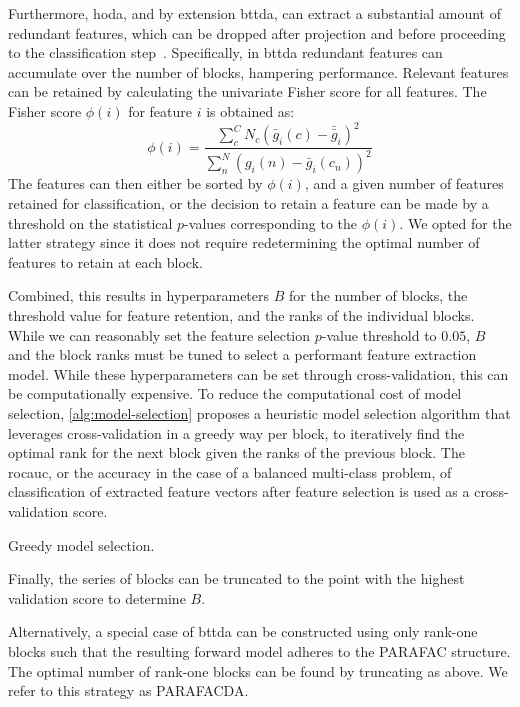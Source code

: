 Furthermore, \ac{hoda}, and by extension \ac{bttda}, can extract a substantial amount
of redundant features, which can be dropped after projection and before proceeding to the classification
step~\cite{Phan2010}.
Specifically, in \ac{bttda} redundant features can accumulate over the number of
blocks, hampering performance.
Relevant features can be retained by calculating the
univariate Fisher score for all features.
The Fisher score $\phi(i)$ for feature $i$ is obtained as:
\begin{equation}
	\phi(i) = \frac
	{\sum_c^C N_c \left(\bar{g}_i(c)-\bar{\bar{g}}_i\right)^2}
	{\sum_n^N \left(g_i(n)-\bar{g}_i(c_n)\right)^2}
\end{equation}
The features can then either be sorted by $\phi(i)$, and a given number of
features retained for classification, or the decision to retain a feature can
be made by a threshold on the statistical $p$-values corresponding to the
$\phi(i)$.
We opted for the latter strategy since it does not require redetermining the
optimal number of features to retain at each block.

Combined, this results in hyperparameters $B$ for the number of blocks, the
threshold value for feature retention, and the ranks of the individual blocks.
While we can reasonably set the feature selection $p$-value threshold to $0.05$,
$B$ and the block ranks must be tuned to select a performant feature extraction
model.
While these hyperparameters can be set through cross-validation, this can be
computationally expensive.
To reduce the computational cost of model selection,
\cref{alg:model-selection} proposes a heuristic model selection
algorithm that leverages cross-validation in a greedy way per block, to
iteratively find the optimal rank for the next block given the ranks of the
previous block.
The \ac{rocauc}, or the accuracy in the case of a balanced multi-class problem,
of classification of extracted feature vectors after feature selection is used as
a cross-validation score.
\begin{algorithm}
  \caption[Greedy model selection procedure.]{Greedy model selection.}
	\label{alg:model-selection}
	
\end{algorithm}
Finally, the series of blocks can be truncated to the point with
the highest validation score to determine $B$.

Alternatively, a special case of \ac{bttda} can be constructed using only rank-one
blocks such that the resulting forward model adheres to the PARAFAC structure.
The optimal number of rank-one blocks can be found by truncating as above.
We refer to this strategy as PARAFACDA.

